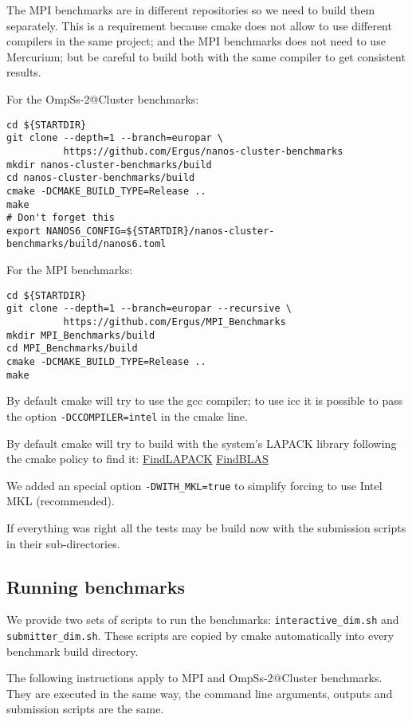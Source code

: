 \documentclass{article}
\newcommand{\code}[1]{\texttt{#1}}
\begin{document}
The MPI benchmarks are in different repositories so we need to build
them separately. This is a requirement because cmake does not allow to use
different compilers in the same project; and the MPI benchmarks does
not need to use Mercurium; but be careful to build both with the same
compiler to get consistent results.

For the OmpSs-2@Cluster benchmarks:

\begin{lstlisting}
cd ${STARTDIR}
git clone --depth=1 --branch=europar \
          https://github.com/Ergus/nanos-cluster-benchmarks
mkdir nanos-cluster-benchmarks/build
cd nanos-cluster-benchmarks/build
cmake -DCMAKE_BUILD_TYPE=Release ..
make
# Don't forget this
export NANOS6_CONFIG=${STARTDIR}/nanos-cluster-benchmarks/build/nanos6.toml
\end{lstlisting}

For the MPI benchmarks:

\begin{lstlisting}
cd ${STARTDIR}
git clone --depth=1 --branch=europar --recursive \
          https://github.com/Ergus/MPI_Benchmarks
mkdir MPI_Benchmarks/build
cd MPI_Benchmarks/build
cmake -DCMAKE_BUILD_TYPE=Release ..
make
\end{lstlisting}

By default cmake will try to use the gcc compiler; to use icc it is
possible to pass the option \code{-DCCOMPILER=intel} in the cmake
line.

By default cmake will try to build with the system's LAPACK library
following the cmake policy to find it:
\href{https://cmake.org/cmake/help/latest/module/FindLAPACK.html}{FindLAPACK}
\href{https://cmake.org/cmake/help/latest/module/FindBLAS.html}{FindBLAS}

We added an special option \code{-DWITH\_MKL=true} to simplify forcing
to use Intel MKL (recommended).

If everything was right all the tests may be build now with the
submission scripts in their sub-directories.

\subsection{Running benchmarks}

We provide two sets of scripts to run the benchmarks:
\code{interactive\_dim.sh} and \code{submitter\_dim.sh}. These scripts
are copied by cmake automatically into every benchmark build
directory.

The following instructions apply to MPI and OmpSs-2@Cluster
benchmarks.  They are executed in the same way, the command line
arguments, outputs and submission scripts are the same.
\end{document}
